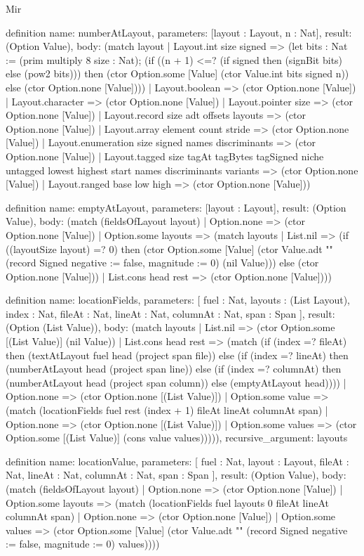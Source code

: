 \begin{lexlean}{Mir}
\begin{semanticmodule}
definition{
  name: numberAtLayout,
  parameters: [layout : Layout, n : Nat],
  result: (Option Value),
  body: (match layout
    | Layout.int size signed => (let bits : Nat := (prim multiply 8 size : Nat); (if ((n + 1) <=? (if signed then (signBit bits) else (pow2 bits))) then (ctor Option.some [Value] (ctor Value.int bits signed n)) else (ctor Option.none [Value])))
    | Layout.boolean => (ctor Option.none [Value])
    | Layout.character => (ctor Option.none [Value])
    | Layout.pointer size => (ctor Option.none [Value])
    | Layout.record size adt offsets layouts => (ctor Option.none [Value])
    | Layout.array element count stride => (ctor Option.none [Value])
    | Layout.enumeration size signed names discriminants => (ctor Option.none [Value])
    | Layout.tagged size tagAt tagBytes tagSigned niche untagged lowest highest start names discriminants variants => (ctor Option.none [Value])
    | Layout.ranged base low high => (ctor Option.none [Value]))
}

definition{
  name: emptyAtLayout,
  parameters: [layout : Layout],
  result: (Option Value),
  body: (match (fieldsOfLayout layout)
    | Option.none => (ctor Option.none [Value])
    | Option.some layouts => (match layouts
      | List.nil => (if ((layoutSize layout) =? 0) then (ctor Option.some [Value] (ctor Value.adt "" (record Signed {negative := false, magnitude := 0}) (nil Value))) else (ctor Option.none [Value]))
      | List.cons head rest => (ctor Option.none [Value])))
}

definition{
  name: locationFields,
  parameters: [
    fuel : Nat,
    layouts : (List Layout),
    index : Nat,
    fileAt : Nat,
    lineAt : Nat,
    columnAt : Nat,
    span : Span
  ],
  result: (Option (List Value)),
  body: (match layouts
    | List.nil => (ctor Option.some [(List Value)] (nil Value))
    | List.cons head rest => (match (if (index =? fileAt) then (textAtLayout fuel head (project span file)) else (if (index =? lineAt) then (numberAtLayout head (project span line)) else (if (index =? columnAt) then (numberAtLayout head (project span column)) else (emptyAtLayout head))))
      | Option.none => (ctor Option.none [(List Value)])
      | Option.some value => (match (locationFields fuel rest (index + 1) fileAt lineAt columnAt span)
        | Option.none => (ctor Option.none [(List Value)])
        | Option.some values => (ctor Option.some [(List Value)] (cons value values))))),
  recursive_argument: layouts
}

definition{
  name: locationValue,
  parameters: [
    fuel : Nat,
    layout : Layout,
    fileAt : Nat,
    lineAt : Nat,
    columnAt : Nat,
    span : Span
  ],
  result: (Option Value),
  body: (match (fieldsOfLayout layout)
    | Option.none => (ctor Option.none [Value])
    | Option.some layouts => (match (locationFields fuel layouts 0 fileAt lineAt columnAt span)
      | Option.none => (ctor Option.none [Value])
      | Option.some values => (ctor Option.some [Value] (ctor Value.adt "" (record Signed {negative := false, magnitude := 0}) values))))
}


\end{semanticmodule}
\end{lexlean}
